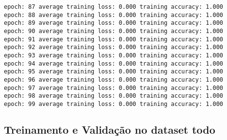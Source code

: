 \documentclass[10pt]{article}
\begin{document}
\begin{Verbatim}[commandchars=\\\{\}]
epoch: 87 average training loss: 0.000 training accuracy: 1.000
epoch: 88 average training loss: 0.000 training accuracy: 1.000
epoch: 89 average training loss: 0.000 training accuracy: 1.000
epoch: 90 average training loss: 0.000 training accuracy: 1.000
epoch: 91 average training loss: 0.000 training accuracy: 1.000
epoch: 92 average training loss: 0.000 training accuracy: 1.000
epoch: 93 average training loss: 0.000 training accuracy: 1.000
epoch: 94 average training loss: 0.000 training accuracy: 1.000
epoch: 95 average training loss: 0.000 training accuracy: 1.000
epoch: 96 average training loss: 0.000 training accuracy: 1.000
epoch: 97 average training loss: 0.000 training accuracy: 1.000
epoch: 98 average training loss: 0.000 training accuracy: 1.000
epoch: 99 average training loss: 0.000 training accuracy: 1.000
    \end{Verbatim}

    \hypertarget{treinamento-e-validauxe7uxe3o-no-dataset-todo}{%
\subsection{Treinamento e Validação no dataset
todo}\label{treinamento-e-validauxe7uxe3o-no-dataset-todo}}
\end{document}

